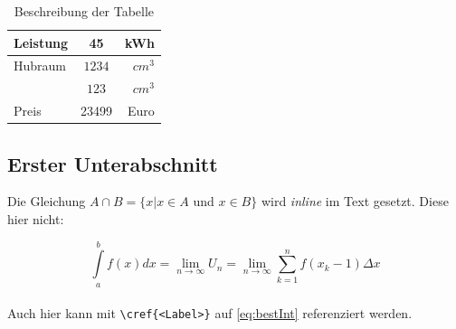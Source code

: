 \documentclass[BCOR=1cm, twoside, ngerman]{scrreprt}
\begin{document}
\begin{table}[h] %
\label{tab:beispieltabelle} %
\caption{Beschreibung der Tabelle}
\centering
  \begin{tabular}{|lc|r|}
    \hline
    Leistung & 45 & kWh \\
    \hline
    Hubraum & $1234$ & $cm^3$ \\
    \cline{3-3}
    & $123$ & $cm^3$ \\
    Preis & 23499 & Euro \\
    \hline
  \end{tabular}
\end{table}

\subsection{Erster Unterabschnitt}
Die Gleichung $A \cap B = \{ x | x \in A$ und $x \in B \}$ wird \emph{inline} im Text gesetzt. Diese hier nicht:

\begin{equation}
  \int\limits_{a}^{b}f(x)dx
  = \lim\limits_{n\rightarrow \infty} U_{n}
  = \lim\limits_{n\rightarrow \infty} \sum\limits_{k=1}^{n}f(x_{k} -1)\Delta x
\label{eq:bestInt}
\end{equation}\\

Auch hier kann mit \texttt{\textbackslash cref\{<Label>\}} auf \cref{eq:bestInt} referenziert werden.

\printbibliography[heading=bibintoc, title={Literaturverzeichnis}]


% 
% 
% 
% 
% 
\end{document}
